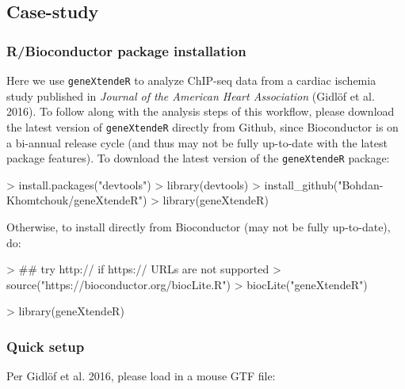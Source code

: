 \documentclass[12pt]{article}
\begin{document}
\subsection{Case-study}

\subsubsection{R/Bioconductor package installation} \label{sec:install}

Here we use \texttt{geneXtendeR} to analyze ChIP-seq data from a cardiac ischemia study published in \emph{Journal of the American Heart Association} (Gidl\"{o}f et al. 2016).  To follow along with the analysis steps of this workflow, please download the latest version of \texttt{geneXtendeR} directly from Github, since Bioconductor is on a bi-annual release cycle (and thus may not be fully up-to-date with the latest package features).  To download the latest version of the \texttt{geneXtendeR} package:

\begin{Schunk}
\begin{Sinput}
> install.packages("devtools")
> library(devtools)
> install_github("Bohdan-Khomtchouk/geneXtendeR")
> library(geneXtendeR)
\end{Sinput}
\end{Schunk}

Otherwise, to install directly from Bioconductor (may not be fully up-to-date), do:

\begin{Schunk}
\begin{Sinput}
> ## try http:// if https:// URLs are not supported
> source("https://bioconductor.org/biocLite.R")
> biocLite("geneXtendeR")
\end{Sinput}
\end{Schunk}

\begin{Schunk}
\begin{Sinput}
> library(geneXtendeR)
\end{Sinput}
\end{Schunk}

\subsubsection{Quick setup}

Per Gidl\"{o}f et al. 2016, please load in a mouse GTF file:

\end{document}

